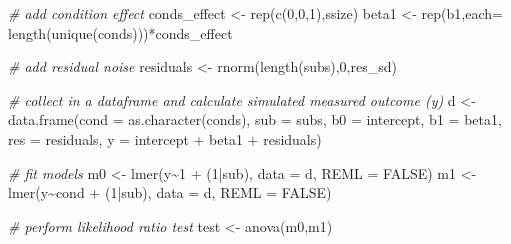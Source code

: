 \documentclass[
]{article}
\newenvironment{Shaded}{\begin{snugshade}}{\end{snugshade}}
\newcommand{\AttributeTok}[1]{\textcolor[rgb]{0.77,0.63,0.00}{#1}}
\newcommand{\CommentTok}[1]{\textcolor[rgb]{0.56,0.35,0.01}{\textit{#1}}}
\newcommand{\ConstantTok}[1]{\textcolor[rgb]{0.00,0.00,0.00}{#1}}
\newcommand{\DecValTok}[1]{\textcolor[rgb]{0.00,0.00,0.81}{#1}}
\newcommand{\FunctionTok}[1]{\textcolor[rgb]{0.00,0.00,0.00}{#1}}
\newcommand{\NormalTok}[1]{#1}
\newcommand{\OtherTok}[1]{\textcolor[rgb]{0.56,0.35,0.01}{#1}}
\newcommand{\SpecialCharTok}[1]{\textcolor[rgb]{0.00,0.00,0.00}{#1}}
\newcommand{\StringTok}[1]{\textcolor[rgb]{0.31,0.60,0.02}{#1}}
\begin{document}
\begin{Shaded}
\begin{Highlighting}[]
      \CommentTok{\# add condition effect}
\NormalTok{      conds\_effect }\OtherTok{\textless{}{-}} \FunctionTok{rep}\NormalTok{(}\FunctionTok{c}\NormalTok{(}\DecValTok{0}\NormalTok{,}\DecValTok{0}\NormalTok{,}\DecValTok{1}\NormalTok{),ssize)}
\NormalTok{      beta1 }\OtherTok{\textless{}{-}} \FunctionTok{rep}\NormalTok{(b1,}\AttributeTok{each=} \FunctionTok{length}\NormalTok{(}\FunctionTok{unique}\NormalTok{(conds)))}\SpecialCharTok{*}\NormalTok{conds\_effect}
      
      \CommentTok{\# add residual noise}
\NormalTok{      residuals }\OtherTok{\textless{}{-}} \FunctionTok{rnorm}\NormalTok{(}\FunctionTok{length}\NormalTok{(subs),}\DecValTok{0}\NormalTok{,res\_sd)}
      
      \CommentTok{\# collect in a dataframe and calculate simulated measured outcome (y)}
\NormalTok{      d }\OtherTok{\textless{}{-}} \FunctionTok{data.frame}\NormalTok{(}\StringTok{\textquotesingle{}cond\textquotesingle{}} \OtherTok{=} \FunctionTok{as.character}\NormalTok{(conds), }
                      \StringTok{\textquotesingle{}sub\textquotesingle{}} \OtherTok{=}\NormalTok{ subs,}
                      \StringTok{\textquotesingle{}b0\textquotesingle{}} \OtherTok{=}\NormalTok{ intercept,}
                      \StringTok{\textquotesingle{}b1\textquotesingle{}} \OtherTok{=}\NormalTok{ beta1,}
                      \StringTok{\textquotesingle{}res\textquotesingle{}} \OtherTok{=}\NormalTok{ residuals,}
                      \StringTok{\textquotesingle{}y\textquotesingle{}} \OtherTok{=}\NormalTok{ intercept }\SpecialCharTok{+}\NormalTok{ beta1 }\SpecialCharTok{+}\NormalTok{ residuals)}
      
      \CommentTok{\# fit models}
\NormalTok{      m0 }\OtherTok{\textless{}{-}} \FunctionTok{lmer}\NormalTok{(y}\SpecialCharTok{\textasciitilde{}}\DecValTok{1} \SpecialCharTok{+}\NormalTok{ (}\DecValTok{1}\SpecialCharTok{|}\NormalTok{sub), }\AttributeTok{data =}\NormalTok{ d, }\AttributeTok{REML =} \ConstantTok{FALSE}\NormalTok{)}
\NormalTok{      m1 }\OtherTok{\textless{}{-}} \FunctionTok{lmer}\NormalTok{(y}\SpecialCharTok{\textasciitilde{}}\NormalTok{cond }\SpecialCharTok{+}\NormalTok{ (}\DecValTok{1}\SpecialCharTok{|}\NormalTok{sub), }\AttributeTok{data =}\NormalTok{ d, }\AttributeTok{REML =} \ConstantTok{FALSE}\NormalTok{)}
      
      \CommentTok{\# perform likelihood ratio test}
\NormalTok{      test }\OtherTok{\textless{}{-}} \FunctionTok{anova}\NormalTok{(m0,m1)}
      

\end{Highlighting}
\end{Shaded}
\end{document}
